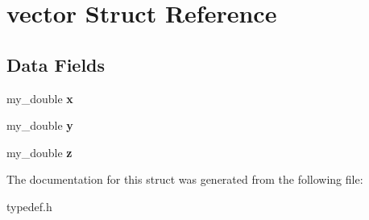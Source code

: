 \hypertarget{structvector}{\section{vector Struct Reference}
\label{structvector}
}
\subsection*{Data Fields}
\begin{DoxyCompactItemize}
\item 
\hypertarget{structvector_a6ac87a1ee4a37e61900d9ac7a051f59f}{my\-\_\-double {\bfseries x}}\label{structvector_a6ac87a1ee4a37e61900d9ac7a051f59f}

\item 
\hypertarget{structvector_a3553d99959437737421bb1b7303e190f}{my\-\_\-double {\bfseries y}}\label{structvector_a3553d99959437737421bb1b7303e190f}

\item 
\hypertarget{structvector_a9c4cac201403bcee02dcc9617da34d75}{my\-\_\-double {\bfseries z}}\label{structvector_a9c4cac201403bcee02dcc9617da34d75}

\end{DoxyCompactItemize}


The documentation for this struct was generated from the following file\-:\begin{DoxyCompactItemize}
\item 
typedef.\-h\end{DoxyCompactItemize}
